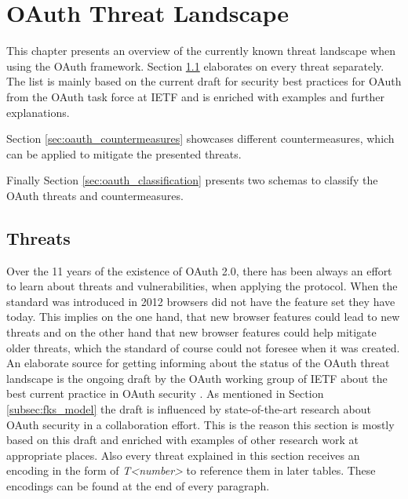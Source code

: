 \documentclass[
    fontsize=12pt,
    headings=small,
    parskip=half,           %
    bibliography=totoc,
    numbers=noenddot,       %
    open=any,               %
    ]{scrreprt}
\begin{document}
\chapter{OAuth Threat Landscape}
\label{chap:oauth_security}

This chapter presents an overview of the currently known threat landscape when using the OAuth framework. Section \ref{sec:oauth_threats} elaborates on every threat separately. The list is mainly based on the current draft for security best practices for OAuth from the OAuth task force at IETF \cite{lodderstedt2020oauth} and is enriched with examples and further explanations.

Section \ref{sec:oauth_countermeasures} showcases different countermeasures, which can be applied to mitigate the presented threats. 

Finally Section \ref{sec:oauth_classification} presents two schemas to classify the OAuth threats and countermeasures.

\section{Threats}
\label{sec:oauth_threats}
Over the 11 years of the existence of OAuth 2.0, there has been always an effort to learn about threats and vulnerabilities, when applying the protocol. When the standard was introduced in 2012 browsers did not have the feature set they have today. This implies on the one hand, that new browser features could lead to new threats and on the other hand that new browser features could help mitigate older threats, which the standard of course could not foresee when it was created. An elaborate source for getting informing about the status of the OAuth threat landscape is the ongoing draft by the OAuth working group of IETF about the best current practice in OAuth security \cite{lodderstedt2020oauth}. As mentioned in Section \ref{subsec:fks_model} the draft is influenced by state-of-the-art research about OAuth security in a collaboration effort. This is the reason this section is mostly based on this draft and enriched with examples of other research work at appropriate places. Also every threat explained in this section receives an encoding in the form of \emph{T<number>} to reference them in later tables. These encodings can be found at the end of every paragraph.
\end{document}
